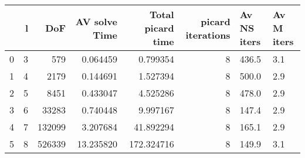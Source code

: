 \begin{tabular}{lrrrrrll}
\toprule
{} &  l &     DoF &  AV solve Time &  Total picard time &  picard iterations & Av NS iters & Av M iters \\
\midrule
0 &  3 &     579 &       0.064459 &           0.799354 &                  8 &       436.5 &        3.1 \\
1 &  4 &    2179 &       0.144691 &           1.527394 &                  8 &       500.0 &        2.9 \\
2 &  5 &    8451 &       0.433047 &           4.525286 &                  8 &       478.0 &        2.9 \\
3 &  6 &   33283 &       0.740448 &           9.997167 &                  8 &       147.4 &        2.9 \\
4 &  7 &  132099 &       3.207684 &          41.892294 &                  8 &       165.1 &        2.9 \\
5 &  8 &  526339 &      13.235820 &         172.324716 &                  8 &       149.9 &        3.1 \\
\bottomrule
\end{tabular}
